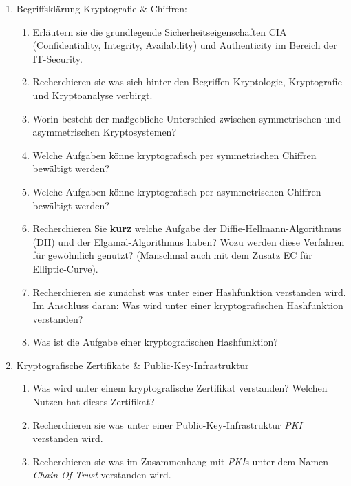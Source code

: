 \documentclass[paper=a4,fontsize=11pt]{scrartcl}%
\numberwithin{equation}{section}
\begin{document}
\begin{enumerate}
	\item Begriffsklärung Kryptografie \& Chiffren:
	\begin{enumerate}
		\item Erläutern sie die grundlegende Sicherheitseigenschaften CIA (Confidentiality, Integrity, Availability) und Authenticity im Bereich der IT-Security.
		\item Recherchieren sie was sich hinter den Begriffen Kryptologie, Kryptografie und Kryptoanalyse verbirgt.
		\item Worin besteht der maßgebliche Unterschied zwischen symmetrischen und asymmetrischen Kryptosystemen?
		\item Welche Aufgaben könne kryptografisch per symmetrischen Chiffren bewältigt werden?
		\item Welche Aufgaben könne kryptografisch per asymmetrischen Chiffren bewältigt werden?
		\item Recherchieren Sie \textbf{kurz} welche Aufgabe der Diffie-Hellmann-Algorithmus (DH) und der Elgamal-Algorithmus haben? Wozu werden diese Verfahren für gewöhnlich genutzt? (Manschmal auch mit dem Zusatz EC für Elliptic-Curve).
		\item Recherchieren sie zunächst was unter einer Hashfunktion verstanden wird. Im Anschluss daran: Was wird unter einer kryptografischen Hashfunktion verstanden?
		\item Was ist die Aufgabe einer kryptografischen Hashfunktion?
	\end{enumerate}
	\item Kryptografische Zertifikate \& Public-Key-Infrastruktur
	\begin{enumerate}
		\item Was wird unter einem kryptografische Zertifikat verstanden? Welchen Nutzen hat dieses Zertifikat?
		\item Recherchieren sie was unter einer Public-Key-Infrastruktur \emph{PKI} verstanden wird.
		\item Recherchieren sie was im Zusammenhang mit \emph{PKI}s unter dem Namen \emph{Chain-Of-Trust} verstanden wird.
	\end{enumerate}
\end{enumerate}
\end{document}
